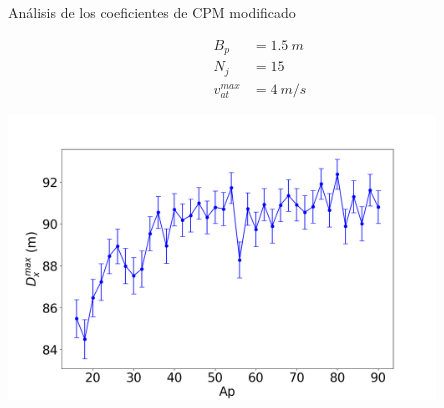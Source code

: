\begin{frame}{Análisis de los coeficientes de CPM modificado}
    \begin{center}
        \begin{minipage}{0.15\textwidth}
            \begin{equation*}
                \begin{aligned}
                    B_p &= 1.5\ m \\
                    N_j &= 15 \\
                    v_{at}^{max} &= 4\ m/s
                \end{aligned}
            \end{equation*}
        \end{minipage}
        \begin{minipage}{0.80\textwidth}
            \hfill\includegraphics[width=0.85\textwidth]{pic/05-resultados/r6}
        \end{minipage}
    \end{center}
    \footnotesize{}
\end{frame}

